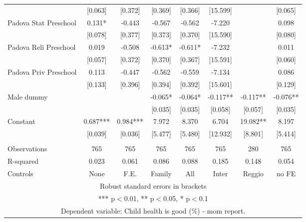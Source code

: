 \begin{tabular}{lccccccc}
 & [0.063] & [0.372] & [0.369] & [0.366] & [15.599] &  & [0.065] \\
Padova Stat Preschool & 0.131* & -0.443 & -0.567 & -0.562 & -7.220 &  & 0.098 \\
 & [0.078] & [0.377] & [0.373] & [0.370] & [15.590] &  & [0.080] \\
Padova Reli Preschool & 0.019 & -0.508 & -0.613* & -0.611* & -7.232 &  & 0.011 \\
 & [0.057] & [0.372] & [0.370] & [0.367] & [15.591] &  & [0.060] \\
Padova Priv Preschool & 0.113 & -0.447 & -0.562 & -0.559 & -7.134 &  & 0.086 \\
 & [0.133] & [0.396] & [0.394] & [0.392] & [15.601] &  & [0.129] \\
Male dummy &  &  & -0.065* & -0.064* & -0.117** & -0.117** & -0.076** \\
 &  &  & [0.035] & [0.035] & [0.058] & [0.057] & [0.035] \\
Constant & 0.687*** & 0.984*** & 7.972 & 8.370 & 6.704 & 19.082** & 8.197 \\
 & [0.039] & [0.036] & [5.477] & [5.480] & [12.932] & [8.801] & [5.414] \\
 &  &  &  &  &  &  &  \\
Observations & 765 & 765 & 765 & 765 & 765 & 280 & 765 \\
R-squared & 0.023 & 0.061 & 0.086 & 0.088 & 0.185 & 0.148 & 0.054 \\
 Controls & None & F.E. & Family & All & Inter & Reggio & no FE \\ \hline
\multicolumn{8}{c}{ Robust standard errors in brackets} \\
\multicolumn{8}{c}{ *** p$<$0.01, ** p$<$0.05, * p$<$0.1} \\
\multicolumn{8}{c}{ Dependent variable: Child health is good (\%) - mom report.} \\
\end{tabular}
